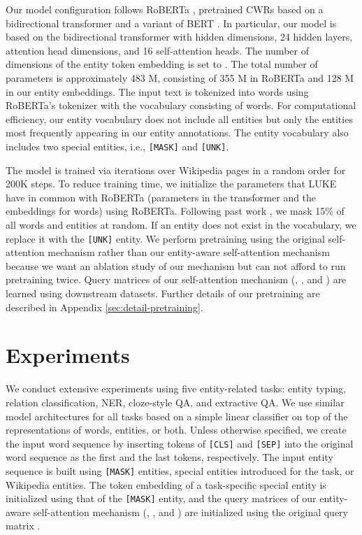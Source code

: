 \documentclass[11pt,a4paper]{article}
\begin{document}
Our model configuration follows RoBERTa \cite{Liu2020RoBERTa:Approach}, pretrained CWRs based on a bidirectional transformer and a variant of BERT \cite{devlin2018bert}.
In particular, our model is based on the bidirectional transformer with  hidden dimensions, 24 hidden layers,  attention head dimensions, and 16 self-attention heads.
The number of dimensions of the entity token embedding is set to .
The total number of parameters is approximately 483 M, consisting of 355 M in RoBERTa and 128 M in our entity embeddings.
The input text is tokenized into words using RoBERTa's tokenizer with the vocabulary consisting of  words.
For computational efficiency, our entity vocabulary does not include all entities but only the  entities most frequently appearing in our entity annotations.
The entity vocabulary also includes two special entities, i.e., \texttt{[MASK]} and \texttt{[UNK]}.

The model is trained via iterations over Wikipedia pages in a random order for 200K steps.
To reduce training time, we initialize the parameters that LUKE have in common with RoBERTa (parameters in the transformer and the embeddings for words) using RoBERTa.
Following past work \cite{devlin2018bert,Liu2020RoBERTa:Approach}, we mask 15\% of all words and entities at random.
If an entity does not exist in the vocabulary, we replace it with the \texttt{[UNK]} entity.
We perform pretraining using the original self-attention mechanism rather than our entity-aware self-attention mechanism because we want an ablation study of our mechanism but can not afford to run pretraining twice.
Query matrices of our self-attention mechanism (, , and ) are learned using downstream datasets.
Further details of our pretraining are described in Appendix \ref{sec:detail-pretraining}.

\section{Experiments}

We conduct extensive experiments using five entity-related tasks: entity typing, relation classification, NER, cloze-style QA, and extractive QA.
We use similar model architectures for all tasks based on a simple linear classifier on top of the representations of words, entities, or both.
Unless otherwise specified, we create the input word sequence by inserting tokens of \texttt{[CLS]} and \texttt{[SEP]} into the original word sequence as the first and the last tokens, respectively.
The input entity sequence is built using \texttt{[MASK]} entities, special entities introduced for the task, or Wikipedia entities.
The token embedding of a task-specific special entity is initialized using that of the \texttt{[MASK]} entity, and the query matrices of our entity-aware self-attention mechanism (, , and ) are initialized using the original query matrix .
\end{document}
